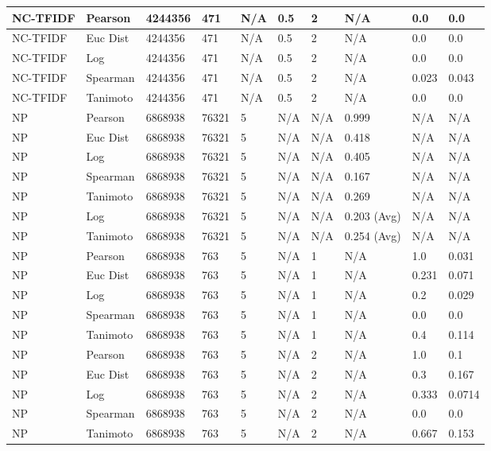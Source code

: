\documentclass{article}
\begin{document}
\begin{longtable}{ |p{1.7cm}|p{1.9cm}|p{1.5cm}|p{1.5cm}|p{0.75cm}|p{0.75cm}|p{0.75cm}|p{0.75cm}|p{1.5cm}|p{1.5cm}|}
    NC-TFIDF  & Pearson & 4244356 & 471 & N/A & 0.5 & 2 & N/A & 0.0 & 0.0  \\ \hline
    NC-TFIDF  & Euc Dist & 4244356 & 471 & N/A & 0.5 & 2 & N/A &0.0 & 0.0   \\ \hline
    NC-TFIDF  & Log & 4244356 & 471 & N/A & 0.5 & 2 & N/A & 0.0 & 0.0  \\ \hline
    NC-TFIDF  & Spearman & 4244356 & 471 & N/A & 0.5 & 2 & N/A &0.023 & 0.043 \\ \hline
    NC-TFIDF  & Tanimoto & 4244356 & 471 & N/A & 0.5 & 2 & N/A & 0.0 & 0.0 \\ \hline
    
    NP & Pearson & 6868938 & 76321 & 5 &  N/A & N/A & 0.999 & N/A & N/A  \\ \hline
    NP & Euc Dist & 6868938 & 76321 & 5 & N/A & N/A & 0.418 & N/A & N/A   \\ \hline
    NP & Log & 6868938 & 76321 & 5 &  N/A & N/A & 0.405 & N/A & N/A  \\ \hline
    NP & Spearman & 6868938 & 76321 & 5 & N/A & N/A & 0.167 & N/A & N/A \\ \hline
    NP & Tanimoto & 6868938 & 76321 & 5 & N/A & N/A & 0.269 & N/A & N/A \\ \hline
    NP & Log & 6868938 & 76321 & 5 & N/A & N/A & 0.203 (Avg) & N/A & N/A \\ \hline
    NP & Tanimoto & 6868938 & 76321 & 5 & N/A & N/A & 0.254 (Avg) & N/A & N/A \\ \hline
    
    NP & Pearson & 6868938 & 763 & 5 &  N/A & 1 & N/A & 1.0 & 0.031  \\ \hline
    NP & Euc Dist & 6868938 & 763 & 5 & N/A & 1 & N/A &0.231 & 0.071   \\ \hline
    NP & Log & 6868938 & 763 & 5 &  N/A & 1 & N/A & 0.2 & 0.029  \\ \hline
    NP & Spearman & 6868938 & 763 & 5 & N/A & 1 & N/A &0.0 & 0.0 \\ \hline
    NP & Tanimoto & 6868938 & 763 & 5 & N/A & 1 & N/A & 0.4 & 0.114 \\ \hline
    
    NP & Pearson & 6868938 & 763 & 5 &  N/A & 2 & N/A & 1.0 & 0.1  \\ \hline
    NP & Euc Dist & 6868938 & 763 & 5 & N/A & 2  & N/A &0.3 & 0.167   \\ \hline
    NP & Log & 6868938 & 763 & 5 &  N/A & 2  & N/A & 0.333 & 0.0714  \\ \hline
    NP & Spearman & 6868938 & 763 & 5 & N/A & 2  & N/A &0.0 & 0.0 \\ \hline
    NP & Tanimoto & 6868938 & 763 & 5 & N/A & 2  & N/A & 0.667 & 0.153 \\ \hline
    

\end{longtable}
\end{document}
